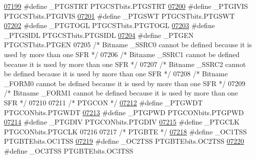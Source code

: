 \begin{DoxyCode}
\hypertarget{a00015_source_l07199}{}\hyperlink{a00015_a28367be61faa0a595c34aa5761b42a23}{07199} \textcolor{preprocessor}{#define \_PTGSTRT PTGCSTbits.PTGSTRT}
\hypertarget{a00015_source_l07200}{}\hyperlink{a00015_a40893f6d936af2fbd9cecd108397721c}{07200} \textcolor{preprocessor}{#define \_PTGIVIS PTGCSTbits.PTGIVIS}
\hypertarget{a00015_source_l07201}{}\hyperlink{a00015_a70adc7566def349f6c456cb762b79203}{07201} \textcolor{preprocessor}{#define \_PTGSWT PTGCSTbits.PTGSWT}
\hypertarget{a00015_source_l07202}{}\hyperlink{a00015_afb5c8e1ad5f23ceae8e8edd477bf16d8}{07202} \textcolor{preprocessor}{#define \_PTGTOGL PTGCSTbits.PTGTOGL}
\hypertarget{a00015_source_l07203}{}\hyperlink{a00015_a59fe8beb7b889504ffbfdc9a4c50c206}{07203} \textcolor{preprocessor}{#define \_PTGSIDL PTGCSTbits.PTGSIDL}
\hypertarget{a00015_source_l07204}{}\hyperlink{a00015_a80a0d78b6d6c6943389fd159cb90789f}{07204} \textcolor{preprocessor}{#define \_PTGEN PTGCSTbits.PTGEN}
07205 \textcolor{comment}{/* Bitname \_SSRC0 cannot be defined because it is used by more than one SFR */}
07206 \textcolor{comment}{/* Bitname \_SSRC1 cannot be defined because it is used by more than one SFR */}
07207 \textcolor{comment}{/* Bitname \_SSRC2 cannot be defined because it is used by more than one SFR */}
07208 \textcolor{comment}{/* Bitname \_FORM0 cannot be defined because it is used by more than one SFR */}
07209 \textcolor{comment}{/* Bitname \_FORM1 cannot be defined because it is used by more than one SFR */}
07210 
07211 \textcolor{comment}{/* PTGCON */}
\hypertarget{a00015_source_l07212}{}\hyperlink{a00015_a5c8fa536d6751a4f25087bcc4bbf95a2}{07212} \textcolor{preprocessor}{#define \_PTGWDT PTGCONbits.PTGWDT}
\hypertarget{a00015_source_l07213}{}\hyperlink{a00015_aef6a1042a9cd5b6ed7c95ee1c6762486}{07213} \textcolor{preprocessor}{#define \_PTGPWD PTGCONbits.PTGPWD}
\hypertarget{a00015_source_l07214}{}\hyperlink{a00015_a239a880fca842b204c2c0d04dd8fc267}{07214} \textcolor{preprocessor}{#define \_PTGDIV PTGCONbits.PTGDIV}
\hypertarget{a00015_source_l07215}{}\hyperlink{a00015_a8fa661f07516b82aed78e416d65ad0a4}{07215} \textcolor{preprocessor}{#define \_PTGCLK PTGCONbits.PTGCLK}
07216 
07217 \textcolor{comment}{/* PTGBTE */}
\hypertarget{a00015_source_l07218}{}\hyperlink{a00015_a6ad73a7e2ab9bc45e4597e4ff40c8e4f}{07218} \textcolor{preprocessor}{#define \_OC1TSS PTGBTEbits.OC1TSS}
\hypertarget{a00015_source_l07219}{}\hyperlink{a00015_a52a19799e0cccda13d085170fb0eb4a3}{07219} \textcolor{preprocessor}{#define \_OC2TSS PTGBTEbits.OC2TSS}
\hypertarget{a00015_source_l07220}{}\hyperlink{a00015_ae16c0b64a6447eb5c2d85ffd5ae84130}{07220} \textcolor{preprocessor}{#define \_OC3TSS PTGBTEbits.OC3TSS}

\end{DoxyCode}
